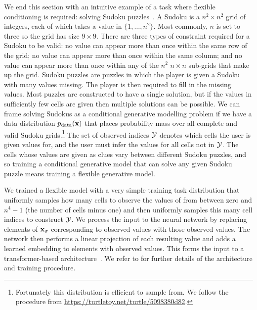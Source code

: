 We end this section with an intuitive example of a task where flexible conditioning is required: solving Sudoku puzzles~\citep{weilbach2023graphically}. A Sudoku is a $n^2 \times n^2$ grid of integers, each of which takes a value in $\{1,\ldots,n^2\}$. Most commonly, $n$ is set to three so the grid has size $9 \times 9$. There are three types of constraint required for a Sudoku to be valid: no value can appear more than once within the same row of the grid; no value can appear more than once within the same column; and no value can appear more than once within any of the $n^2$ $n \times n$ sub-grids that make up the grid. Sudoku puzzles are puzzles in which the player is given a Sudoku with many values missing. The player is then required to fill in the missing values. Most puzzles are constructed to have a single solution, but if the values in sufficiently few cells are given then multiple solutions can be possible. We can frame solving Sudokus as a conditional generative modelling problem if we have a data distribution $p_{\rm{data}}({\mathbf{x}})$ that places probability mass over all complete and valid Sudoku grids.\footnote{Fortunately this distribution is efficient to sample from. We follow the procedure from \url{https://turtletoy.net/turtle/5098380d82}.} The set of observed indices ${\mathcal{Y}}$ denotes which cells the user is given values for, and the user must infer the values for all cells not in ${\mathcal{Y}}$. The cells whose values are given as clues vary between different Sudoku puzzles, and so training a conditional generative model that can solve any given Sudoku puzzle means training a flexible generative model. 

We trained a flexible model with a very simple training task distribution that uniformly samples how many cells to observe the values of from between zero and $n^4-1$ (the number of cells minus one) and then uniformly samples this many cell indices to construct ${\mathcal{Y}}$. We process the input to the neural network by replacing elements of ${\mathbf{x}}_\sigma$ corresponding to observed values with those observed values. The network then performs a linear projection of each resulting value and adds a learned embedding to elements with observed values. This forms the input to a transformer-based architecture~\citep{vaswani2017attention}. We refer to \citet{weilbach2023graphically} for further details of the architecture and training procedure.

